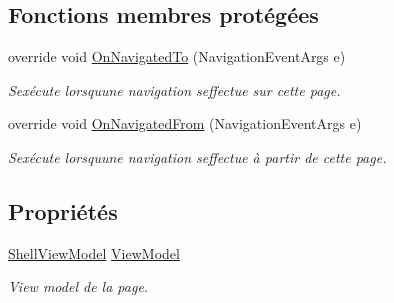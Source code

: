 \subsection*{Fonctions membres protégées}
\begin{DoxyCompactItemize}
\item 
override void \hyperlink{class_boxes_1_1_views_1_1_shell_af504d729ce47da92d98123368a9cf8de}{On\+Navigated\+To} (Navigation\+Event\+Args e)
\begin{DoxyCompactList}\small\item\em S\textquotesingle{}exécute lorsqu\textquotesingle{}une navigation s\textquotesingle{}effectue sur cette page. \end{DoxyCompactList}\item 
override void \hyperlink{class_boxes_1_1_views_1_1_shell_a1826504ec95a91ff7460184b1c9033e8}{On\+Navigated\+From} (Navigation\+Event\+Args e)
\begin{DoxyCompactList}\small\item\em S\textquotesingle{}exécute lorsqu\textquotesingle{}une navigation s\textquotesingle{}effectue à partir de cette page. \end{DoxyCompactList}\end{DoxyCompactItemize}
\subsection*{Propriétés}
\begin{DoxyCompactItemize}
\item 
\hyperlink{class_boxes_1_1_view_models_1_1_shell_view_model}{Shell\+View\+Model} \hyperlink{class_boxes_1_1_views_1_1_shell_a6b274fcc0d3ec20c8a20ac27ff0686e3}{View\+Model}
\begin{DoxyCompactList}\small\item\em View model de la page. \end{DoxyCompactList}\end{DoxyCompactItemize}
